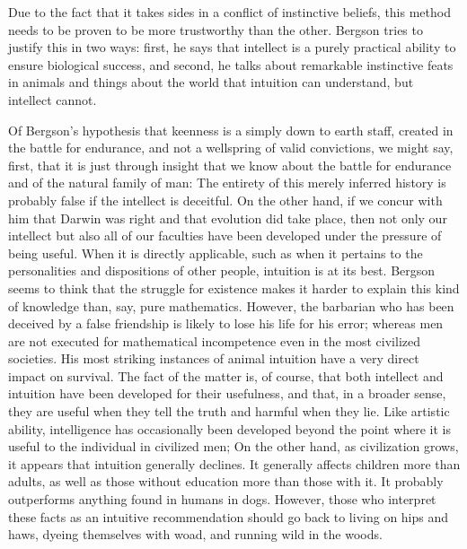 \documentclass[a4paper,12pt]{book}[2004/02/16]
\theoremstyle{ilemma}
\theoremstyle{itheorem}
\theoremstyle{iother}
\theoremstyle{icorollary}
\theoremstyle{numcorollary}
\theoremstyle{idefinition}
\begin{document}
Due to the fact that it takes sides in a conflict of instinctive beliefs, this method needs to be proven to be more trustworthy than the other.
Bergson tries to justify this in two ways: first, he says that intellect is a purely practical ability to ensure biological success, and second, he talks about remarkable instinctive feats in animals and things about the world that intuition can understand, but intellect cannot.

Of Bergson's hypothesis that keenness is a simply down to earth staff,
created in the battle for endurance, and not a wellspring of valid
convictions, we might say, first, that it is just through insight that we
know about the battle for endurance and of the natural family of
man: The entirety of this merely inferred history is probably false if the intellect is deceitful. On the other hand, if we concur with him that Darwin was right and that evolution did take place, then not only our intellect but also all of our faculties have been developed under the pressure of being useful. When it is directly applicable, such as when it pertains to the personalities and dispositions of other people, intuition is at its best. Bergson seems to think that the struggle for existence makes it harder to explain this kind of knowledge than, say, pure mathematics. However, the barbarian who has been deceived by a false friendship is likely to lose his life for his error; whereas men are not executed for mathematical incompetence even in the most civilized societies. His most striking instances of animal intuition have a very direct impact on survival. The fact of the matter is, of course, that both intellect and intuition have been developed for their usefulness, and that, in a broader sense, they are useful when they tell the truth and harmful when they lie. Like artistic ability, intelligence has occasionally been developed beyond the point where it is useful to the individual in civilized men; On the other hand, as civilization grows, it appears that intuition generally declines. It generally affects children more than adults, as well as those without education more than those with it.
It probably outperforms anything found in humans in dogs. However, those who interpret these facts as an intuitive recommendation should go back to living on hips and haws, dyeing themselves with woad, and running wild in the woods.
\end{document}
